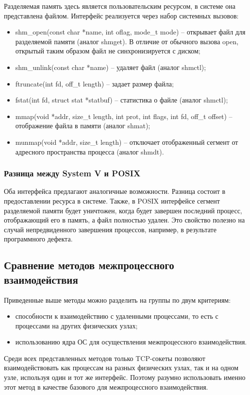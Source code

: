 Разделяемая память здесь является пользовательским ресурсом, в системе она представлена файлом.
Интерфейс реализуется через набор системных вызовов:
\begin{itemize}
\item shm\_open(const char *name, int oflag, mode\_t mode) -- открывает файл для разделяемой памяти (аналог shmget). В отличие от обычного вызова open, открытый таким образом файл не синхронизируется с диском;
\item shm\_unlink(const char *name) -- удаляет файл (аналог shmctl);
\item ftruncate(int fd, off\_t length) -- задает размер файла;
\item fstat(int fd, struct stat *statbuf) -- статистика о файле (аналог shmctl);
\item mmap(void *addr, size\_t length, int prot, int flags, int fd, off\_t offset) -- отображение файла в памяти (аналог shmat);
\item munmap(void *addr, size\_t length) -- отключает отображенный сегмент от адресного пространства процесса (аналог shmdt).
\end{itemize}

\subsubsection{Разница между System V и POSIX}
Оба интерфейса предлагают аналогичные возможности. Разница состоит в предоставлении ресурса в системе. Также, в POSIX интерфейсе сегмент разделяемой памяти будет уничтожен, когда будет завершен последний процесс, отображающий его в память, а файл полностью удален. Это свойство полезно на случай непредвиденного завершения процессов, например, в результате программного дефекта.

\subsection{Сравнение методов межпроцессного взаимодействия}

Приведенные выше методы можно разделить на группы по двум критериям:
\begin{itemize} 
\item способности к взаимодействию с удаленными процессами, то есть с процессами на других физических узлах;
\item использованию ядра ОС для осуществления межпроцессного взаимодействия.
\end{itemize}

Среди всех представленных методов только TCP-сокеты позволяют взаимодействовать как процессам на разных физических узлах, так и на одном узле, используя один и тот же интерфейс. Поэтому разумно использовать именно этот метод в качестве базового для межпроцессного взаимодействия.

